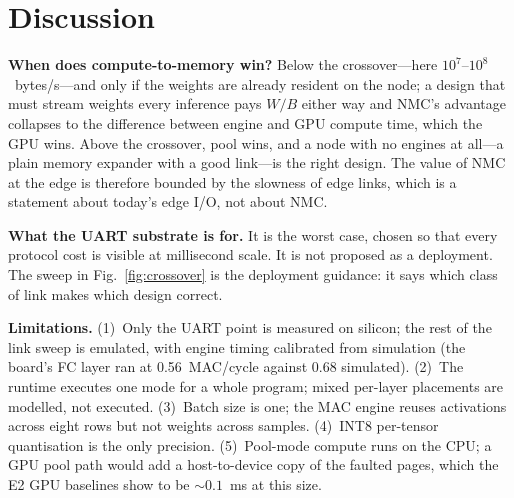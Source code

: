 \documentclass[lettersize,journal]{IEEEtran}
\begin{document}
\section{Discussion}
\label{sec:discussion}

\textbf{When does compute-to-memory win?} Below the crossover---here $10^7$--$10^8$~bytes/s---and only if the weights are already resident on the node; a design that must stream weights every inference pays $W/B$ either way and NMC's advantage collapses to the difference between engine and GPU compute time, which the GPU wins. Above the crossover, pool wins, and a node with no engines at all---a plain memory expander with a good link---is the right design. The value of NMC at the edge is therefore bounded by the slowness of edge links, which is a statement about today's edge I/O, not about NMC.

\textbf{What the UART substrate is for.} It is the worst case, chosen so that every protocol cost is visible at millisecond scale. It is not proposed as a deployment. The sweep in Fig.~\ref{fig:crossover} is the deployment guidance: it says which class of link makes which design correct.

\textbf{Limitations.} (1)~Only the UART point is measured on silicon; the rest of the link sweep is emulated, with engine timing calibrated from simulation (the board's FC layer ran at 0.56~MAC/cycle against 0.68 simulated). (2)~The runtime executes one mode for a whole program; mixed per-layer placements are modelled, not executed. (3)~Batch size is one; the MAC engine reuses activations across eight rows but not weights across samples. (4)~INT8 per-tensor quantisation is the only precision. (5)~Pool-mode compute runs on the CPU; a GPU pool path would add a host-to-device copy of the faulted pages, which the E2 GPU baselines show to be ${\sim}0.1$~ms at this size.

\end{document}
